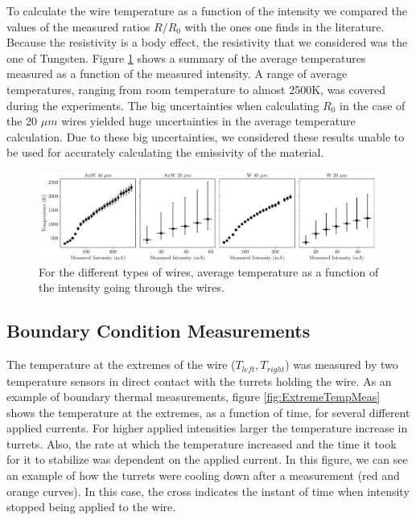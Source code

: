 To calculate the wire temperature as a function of the intensity we compared the values of the measured ratios $R/R_{0}$ with the ones one finds in the literature. Because the resistivity is a body effect, the resistivity that we considered was the one of Tungsten. Figure \ref{fig:MeasTempCurrent} shows a summary of the average temperatures measured as a function of the measured intensity. A range of average temperatures, ranging from room temperature to almost 2500K, was covered during the experiments. The big uncertainties when calculating $R_0$ in the case of the 20 $\mu m$ wires yielded huge uncertainties in the average temperature calculation. Due to these big uncertainties, we considered these results unable to be used for accurately calculating the emissivity of the material.  

\begin{figure}[h]
    \centering
    \includegraphics[width=1.0\columnwidth]{Figure_CalculatedIntTemp/IntensityTemp.pdf}
    \caption{For the different types of wires, average temperature as a function of the intensity going through the wires.}
    \label{fig:MeasTempCurrent}
\end{figure}

\subsection{Boundary Condition Measurements}

The temperature at the extremes of the wire ($T_{left}, T_{right}$) was measured by two temperature sensors in direct contact with the turrets holding the wire. As an example of boundary thermal measurements, figure \ref{fig:ExtremeTempMeas} shows the temperature at the extremes, as a function of time, for several different applied currents. For higher applied intensities larger the temperature increase in turrets. Also, the rate at which the temperature increased and the time it took for it to stabilize was dependent on the applied current. In this figure, we can see an example of how the turrets were cooling down after a measurement (red and orange curves). In this case, the cross indicates the instant of time when intensity stopped being applied to the wire. 

